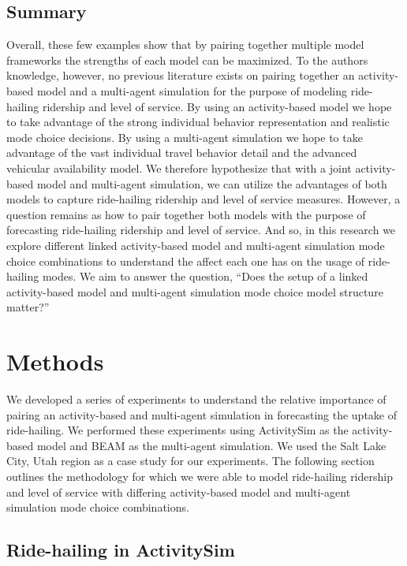 \documentclass[simple, masters, twoside]{byuthesis}
\begin{document}
\hypertarget{summary}{%
\section{Summary}\label{summary}}

Overall, these few examples show that by pairing together multiple model frameworks the strengths of each model can be maximized. To the authors knowledge, however, no previous literature exists on pairing together an activity-based model and a multi-agent simulation for the purpose of modeling ride-hailing ridership and level of service. By using an activity-based model we hope to take advantage of the strong individual behavior representation and realistic mode choice decisions. By using a multi-agent simulation we hope to take advantage of the vast individual travel behavior detail and the advanced vehicular availability model. We therefore hypothesize that with a joint activity-based model and multi-agent simulation, we can utilize the advantages of both models to capture ride-hailing ridership and level of service measures. However, a question remains as how to pair together both models with the purpose of forecasting ride-hailing ridership and level of service. And so, in this research we explore different linked activity-based model and multi-agent simulation mode choice combinations to understand the affect each one has on the usage of ride-hailing modes. We aim to answer the question, ``Does the setup of a linked activity-based model and multi-agent simulation mode choice model structure matter?''

\hypertarget{meth}{%
\chapter{Methods}\label{meth}}

We developed a series of experiments to understand the relative importance of pairing an activity-based and multi-agent simulation in forecasting the uptake of ride-hailing. We performed these experiments using ActivitySim as the activity-based model and BEAM as the multi-agent simulation. We used the Salt Lake City, Utah region as a case study for our experiments. The following section outlines the methodology for which we were able to model ride-hailing ridership and level of service with differing activity-based model and multi-agent simulation mode choice combinations.

\hypertarget{ride-hailing-in-activitysim}{%
\section{Ride-hailing in ActivitySim}\label{ride-hailing-in-activitysim}}
\end{document}
